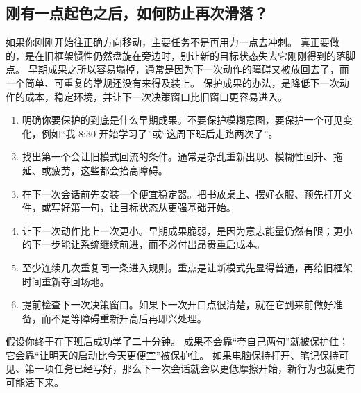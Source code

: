 \subsection{刚有一点起色之后，如何防止再次滑落？}

如果你刚刚开始往正确方向移动，主要任务不是再用力一点去冲刺。
真正要做的，是在旧框架惯性仍然盘旋在旁边时，别让新的目标状态失去它刚刚得到的落脚点。
早期成果之所以容易塌掉，通常是因为下一次动作的障碍又被放回去了，而一个简单、可重复的常规还没有来得及装上。
保护成果的办法，是降低下一次动作的成本，稳定环境，并让下一次决策窗口比旧窗口更容易进入。

\begin{enumerate}[nosep]
  \item 明确你要保护的到底是什么早期成果。不要保护模糊意图，要保护一个可见变化，例如“我 8:30 开始学习了”或“这周下班后走路两次了”。
  \item 找出第一个会让旧模式回流的条件。通常是杂乱重新出现、模糊性回升、拖延、或疲劳，这些都会抬高障碍。
  \item 在下一次会话前先安装一个便宜稳定器。把书放桌上、摆好衣服、预先打开文件，或写好第一句，让目标状态从更强基础开始。
  \item 让下一次动作比上一次更小。早期成果脆弱，是因为意志能量仍然有限；更小的下一步能让系统继续前进，而不必付出昂贵重启成本。
  \item 至少连续几次重复同一条进入规则。重点是让新模式先显得普通，再给旧框架时间重新夺回场地。
  \item 提前检查下一次决策窗口。如果下一次开口点很清楚，就在它到来前做好准备，而不是等障碍重新升高后再即兴处理。
\end{enumerate}

\begin{remark}
假设你终于在下班后成功学了二十分钟。
成果不会靠“夸自己两句”就被保护住；它会靠“让明天的启动比今天更便宜”被保护住。
如果电脑保持打开、笔记保持可见、第一项任务已经写好，那么下一次会话就会以更低摩擦开始，新行为也就更有可能活下来。
\end{remark}